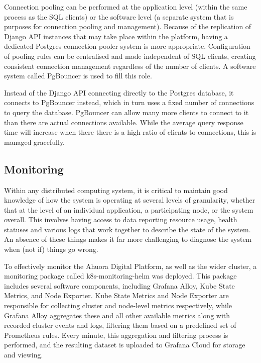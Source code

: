 Connection pooling can be performed at the application level (within the same process as the SQL clients) or the software level (a separate system that is purposes for connection pooling and management). Because of the replication of Django API instances that may take place within the platform, having a dedicated Postgres connection pooler system is more appropriate. Configuration of pooling rules can be centralised and made independent of SQL clients, creating consistent connection management regardless of the number of clients. A software system called PgBouncer is used to fill this role.

Instead of the Django API connecting directly to the Postgres database, it connects to PgBouncer instead, which in turn uses a fixed number of connections to query the database. PgBouncer can allow many more clients to connect to it than there are actual connections available. While the average query response time will increase when there there is a high ratio of clients to connections, this is managed gracefully.


\subsection{Monitoring} \label{section:monitoring-implementation}

Within any distributed computing system, it is critical to maintain good knowledge of how the system is operating at several levels of granularity, whether that at the level of an individual application, a participating node, or the system overall. This involves having access to data reporting resource usage, health statuses and various logs that work together to describe the state of the system. An absence of these things makes it far more challenging to diagnose the system when (not if) things go wrong.

To effectively monitor the Ahuora Digital Platform, as well as the wider cluster, a monitoring package called k8s-monitoring-helm was deployed. This package includes several software components, including Grafana Alloy, Kube State Metrics, and Node Exporter. Kube State Metrics and Node Exporter are responsible for collecting cluster and node-level metrics respectively, while Grafana Alloy aggregates these and all other available metrics along with recorded cluster events and logs, filtering them based on a predefined set of Prometheus rules. Every minute, this aggregation and filtering process is performed, and the resulting dataset is uploaded to Grafana Cloud for storage and viewing.

